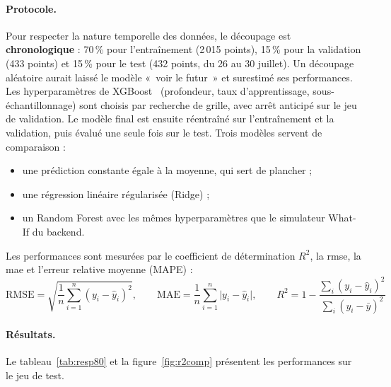 \paragraph{Protocole.} Pour respecter la nature temporelle des données, le découpage est \textbf{chronologique} : 70\,\% pour l'entraînement (2\,015 points), 15\,\% pour la validation (433 points) et 15\,\% pour le test (432 points, du 26 au 30 juillet). Un découpage aléatoire aurait laissé le modèle «~voir le futur~» et surestimé ses performances. Les hyperparamètres de XGBoost~\cite{chen2016} (profondeur, taux d'apprentissage, sous-échantillonnage) sont choisis par recherche de grille, avec arrêt anticipé sur le jeu de validation. Le modèle final est ensuite réentraîné sur l'entraînement et la validation, puis évalué une seule fois sur le test. Trois modèles servent de comparaison :
\begin{itemize}
  \item une prédiction constante égale à la moyenne, qui sert de plancher ;
  \item une régression linéaire régularisée (Ridge) ;
  \item un Random Forest avec les mêmes hyperparamètres que le simulateur What-If du backend.
\end{itemize}
Les performances sont mesurées par le coefficient de détermination $R^2$, la \gls{rmse}, la \gls{mae} et l'erreur relative moyenne (MAPE) :
\[
\mathrm{RMSE}=\sqrt{\frac{1}{n}\sum_{i=1}^{n}(y_i-\hat{y}_i)^2}, \qquad
\mathrm{MAE}=\frac{1}{n}\sum_{i=1}^{n}\lvert y_i-\hat{y}_i\rvert, \qquad
R^2 = 1-\frac{\sum_i (y_i-\hat{y}_i)^2}{\sum_i (y_i-\bar{y})^2}
\]

\paragraph{Résultats.} Le tableau~\ref{tab:resp80} et la figure~\ref{fig:r2comp} présentent les performances sur le jeu de test.

